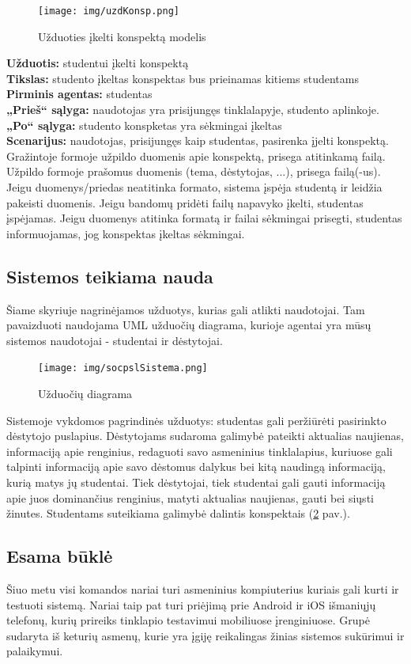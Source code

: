 \documentclass{VUMIFPSkursinis}
\begin{document}
\begin{figure}[H]
\centering
\texttt{[image: img/uzdKonsp.png]}
\caption{Užduoties įkelti konspektą modelis}
\label{fig:konspektas}
\end{figure}
\textbf{Užduotis: } studentui įkelti konspektą\\
\textbf{Tikslas: } studento įkeltas konspektas bus prieinamas kitiems studentams\\
\textbf{Pirminis agentas: } studentas\\
\textbf{„Prieš“ sąlyga: } naudotojas yra prisijungęs tinklalapyje, studento aplinkoje.\\
\textbf{„Po“ sąlyga: } studento konspketas yra sėkmingai įkeltas\\
\textbf{Scenarijus: } naudotojas, prisijungęs kaip studentas, pasirenka įjelti konspektą. Gražintoje formoje užpildo duomenis apie konspektą, prisega atitinkamą failą. Užpildo formoje prašomus duomenis (tema, dėstytojas, ...), prisega failą(-us). Jeigu duomenys/priedas neatitinka formato, sistema įspėja studentą ir leidžia pakeisti duomenis. Jeigu bandomų pridėti failų napavyko įkelti, studentas įspėjamas. Jeigu duomenys atitinka formatą ir failai sėkmingai prisegti, studentas informuojamas, jog konspektas įkeltas sėkmingai.
\endgroup
\subsection{Sistemos teikiama nauda}
Šiame skyriuje nagrinėjamos užduotys, kurias gali atlikti naudotojai. Tam pavaizduoti naudojama UML užduočių diagrama, kurioje agentai yra mūsų sistemos naudotojai - studentai ir dėstytojai.
\begin{figure}[H]
\centering
\texttt{[image: img/socpslSistema.png]}
\caption{Užduočių diagrama}
\label{fig:uzdDiagram}
\end{figure}
Sistemoje vykdomos pagrindinės užduotys: studentas gali peržiūrėti pasirinkto dėstytojo puslapius. Dėstytojams sudaroma galimybė pateikti aktualias naujienas, informaciją apie renginius, redaguoti savo asmeninius tinklalapius, kuriuose gali talpinti informaciją apie savo dėstomus dalykus bei kitą naudingą informaciją, kurią matys jų studentai. Tiek dėstytojai, tiek studentai gali gauti informaciją apie juos dominančius renginius, matyti aktualias naujienas, gauti bei siųsti žinutes. Studentams suteikiama galimybė dalintis konspektais (\ref{fig:uzdDiagram} pav.).
\subsection{Esama būklė}
Šiuo metu visi komandos nariai turi asmeninius kompiuterius kuriais gali kurti ir testuoti sistemą. Nariai taip pat turi priėjimą prie Android ir iOS išmaniųjų telefonų, kurių prireiks tinklapio testavimui mobiliuose įrenginiuose. Grupė sudaryta iš keturių asmenų, kurie yra įgiję reikalingas žinias sistemos sukūrimui ir palaikymui.
\end{document}
